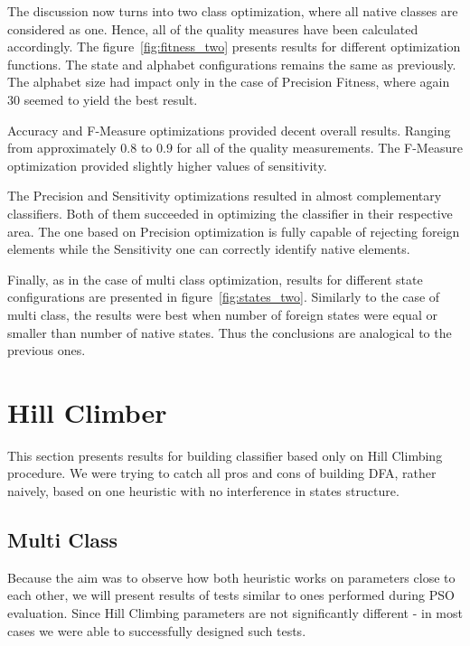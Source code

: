 \documentclass{mini}
\begin{document}
The discussion now turns into two class optimization, where all native classes are considered as one. Hence, all of the quality measures have been calculated accordingly.
The figure~\ref{fig:fitness_two} presents results for different optimization functions. The state and alphabet configurations remains the same as previously. The alphabet size had impact only in the case of Precision Fitness, where again $30$ seemed to yield the best result.

Accuracy and F-Measure optimizations provided decent overall results. Ranging from approximately $0.8$ to $0.9$ for all of the quality measurements. The F-Measure optimization provided slightly higher values of sensitivity.

The Precision and Sensitivity optimizations resulted in almost complementary classifiers. Both of them succeeded in optimizing the classifier in their respective area. The one based on Precision optimization is fully capable of rejecting foreign elements while the Sensitivity one can correctly identify native elements.


Finally, as in the case of multi class optimization, results for different state configurations are presented in figure~\ref{fig:states_two}. Similarly to the case of multi class, the results were best when number of foreign states were equal or smaller than number of native states. Thus the conclusions are analogical to the previous ones.

\makeFigureFitnessTwo
\makeFigureStatesTwo


\pagebreak
%
%
\section{Hill Climber}
This section presents results for building classifier based only on Hill Climbing procedure. We were trying to catch all pros and cons of building DFA, rather naively, based on one heuristic with no interference in states structure. 

\subsection{Multi Class} \label{subsec:multi_class_hc}
Because the aim was to observe how both heuristic works on parameters close to each other, we will present results of tests similar to ones performed during PSO evaluation. Since Hill Climbing parameters are not significantly different - in most cases we were able to successfully designed such tests.
\end{document}
